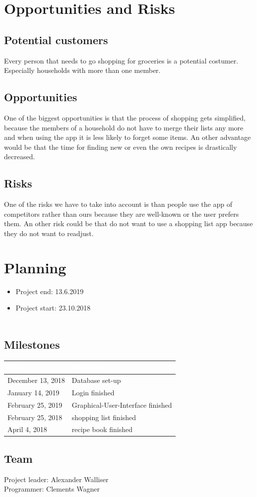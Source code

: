 \documentclass[12pt]{article}
\theoremstyle{definition}
\begin{document}
\pagebreak

\section{Opportunities and Risks}
\subsection{Potential customers}
Every person that needs to go shopping for groceries is a potential costumer.
Especially households with more than one member.

\subsection{Opportunities}
One of the biggest opportunities is that the process of shopping gets simplified, because the members of a household do not have to merge their lists any more and when using the app it is less likely to forget some items. An other advantage would be that the time for finding new or even the own recipes is drastically decreased.

\subsection{Risks}
One of the risks we have to take into account is than people use the app of competitors rather than ours because they are well-known or the user prefers them. An other risk could be that do not want to use a shopping list app because they do not want to readjust.

\pagebreak

\section{Planning}

\begin{itemize}
\item Project end: 13.6.2019
\item Project start: 23.10.2018 \\\\
\end{itemize}

\subsection{Milestones}
\begin{tabular}{|l|l|}
\hline
\cellcolor[gray]{0.5}\textcolor{white}{Date} &
\cellcolor[gray]{0.5}\textcolor{white}{Milestone} \\ \hline
December 13, 2018 & Database set-up \\ \hline
January 14, 2019 & Login finished \\ \hline
February 25, 2019 & Graphical-User-Interface finished \\ \hline
February 25, 2018 & shopping list finished \\ \hline
April 4, 2018 & recipe book finished \\ \hline
\end{tabular}

\subsection{Team}
Project leader: Alexander Walliser \\
Programmer: Clements Wagner
\end{document}
